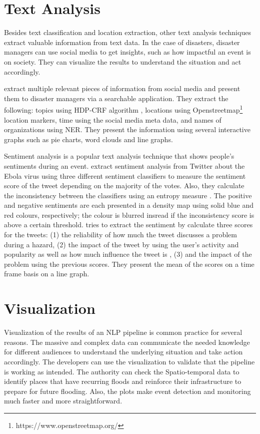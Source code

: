 \section{Text Analysis}

Besides text classification and location extraction, other text analysis techniques extract
valuable information from text data. In the case of disasters, disaster managers can use social
media to get insights, such as how impactful an event is on society. They can visualize the results
to understand the situation and act accordingly. 

 extract multiple relevant pieces of information from
social media and present them to disaster managers via a searchable application. They extract the
following: topics using HDP-CRF algorithm \cite{tehHierarchicalBayesianNonparametric2010},
locations using Openstreetmap\footnote{https://www.openstreetmap.org/} location markers, time using
the social media meta data, and names of organizations using \ac{NER}. They present
the information using several interactive graphs such as pie charts, word clouds and line graphs.

Sentiment analysis is a popular text analysis technique that shows people's sentiments during an
event.  extract sentiment analysis from Twitter about the
Ebola virus using three different sentiment classifiers to measure the sentiment score of the tweet
depending on the majority of the votes. Also, they calculate the inconsistency between the
classifiers using an entropy measure \cite{argamon-engelsonCommitteeBasedSampleSelection1999}. The
positive and negative sentiments are each presented in a density map using solid blue and red
colours, respectively; the colour is blurred insread if the inconsistency score is above a certain
threshold.  tries to extract the sentiment by
calculate three scores for the tweets: (1) the reliability of how much the tweet discusses a problem
during a hazard, (2) the impact of the tweet by using the user's activity and popularity as well as
how much influence the tweet is \cite{palIdentifyingTopicalAuthorities2011}, (3) and the impact of
the problem using the previous scores. They present the mean of the scores on a time frame basis on
a line graph.

\section{Visualization}
Visualization of the results of an \ac{NLP} pipeline is common practice for several reasons. The
massive and complex data can communicate the needed knowledge for different audiences to understand
the underlying situation and take action accordingly. The developers can use the visualization to
validate that the pipeline is working as intended. The authority can check the Spatio-temporal data
to identify places that have recurring floods and reinforce their infrastructure to prepare for
future flooding. Also, the plots make event detection and monitoring much faster and more
straightforward.

